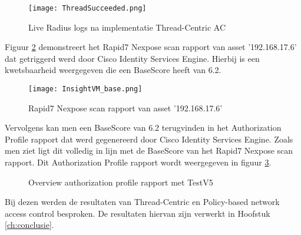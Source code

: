 \begin{figure}[H]
	\centering
	\texttt{[image: ThreadSucceeded.png]}
	\caption{Live Radius logs na implementatie Thread-Centric AC}
	\label{fig:api}
\end{figure}

Figuur \ref{fig:rapid} demonstreert het Rapid7 Nexpose scan rapport van asset '192.168.17.6' dat getriggerd werd door Cisco Identity Services Engine. Hierbij is een kwetsbaarheid weergegeven die een Base\textunderscore Score heeft van 6.2.
\begin{figure}[H]
	\centering
	\texttt{[image: InsightVM\_base.png]}
	\caption{Rapid7 Nexpose scan rapport van asset '192.168.17.6'}
	\label{fig:rapid}
\end{figure}
Vervolgens kan men een Base\textunderscore Score van 6.2 terugvinden in het Authorization Profile rapport dat werd gegenereerd door Cisco Identity Services Engine. Zoals men ziet ligt dit volledig in lijn met de Base\textunderscore Score van het Rapid7 Nexpose scan rapport. Dit Authorization Profile rapport wordt weergegeven in figuur \ref{fig:detail}. 
\begin{figure}[H]
	\centering
	\qquad
	\caption{Overview authorization profile rapport met TestV5}%
	\label{fig:detail}%
\end{figure}

Bij dezen werden de resultaten van Thread-Centric en Policy-based network access control besproken. De resultaten hiervan zijn verwerkt in Hoofstuk \ref{ch:conclusie}.
